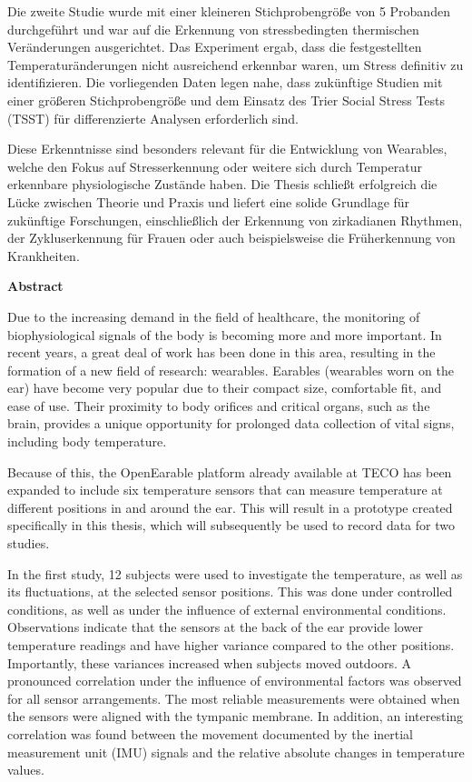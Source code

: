Die zweite Studie wurde mit einer kleineren Stichprobengröße von 5 Probanden durchgeführt und war auf die Erkennung von stressbedingten thermischen Veränderungen ausgerichtet. 
Das Experiment ergab, dass die festgestellten Temperaturänderungen nicht ausreichend erkennbar waren, um Stress definitiv zu identifizieren.
Die vorliegenden Daten legen nahe, dass zukünftige Studien mit einer größeren Stichprobengröße und dem Einsatz des Trier Social Stress Tests (TSST) für differenzierte Analysen erforderlich sind.

Diese Erkenntnisse sind besonders relevant für die Entwicklung von Wearables, welche den Fokus auf Stresserkennung oder weitere sich durch Temperatur erkennbare physiologische Zustände haben. 
Die Thesis schließt erfolgreich die Lücke zwischen Theorie und Praxis und liefert eine solide Grundlage für zukünftige Forschungen, einschließlich der Erkennung von zirkadianen Rhythmen, der Zykluserkennung für Frauen oder auch beispielsweise die Früherkennung von Krankheiten.

\cleardoublepage
\vspace*{1em}
\begin{center}
	\textbf{Abstract}
\end{center}
\par

Due to the increasing demand in the field of healthcare, the monitoring of biophysiological signals of the body is becoming more and more important.
In recent years, a great deal of work has been done in this area, resulting in the formation of a new field of research: wearables.
Earables (wearables worn on the ear) have become very popular due to their compact size, comfortable fit, and ease of use. 
Their proximity to body orifices and critical organs, such as the brain, provides a unique opportunity for prolonged data collection of vital signs, including body temperature.


Because of this, the OpenEarable platform already available at TECO has been expanded to include six temperature sensors that can measure temperature at different positions in and around the ear. 
This will result in a prototype created specifically in this thesis, which will subsequently be used to record data for two studies.

In the first study, 12 subjects were used to investigate the temperature, as well as its fluctuations, at the selected sensor positions. 
This was done under controlled conditions, as well as under the influence of external environmental conditions. 
Observations indicate that the sensors at the back of the ear provide lower temperature readings and have higher variance compared to the other positions. 
Importantly, these variances increased when subjects moved outdoors. 
A pronounced correlation under the influence of environmental factors was observed for all sensor arrangements. 
The most reliable measurements were obtained when the sensors were aligned with the tympanic membrane. 
In addition, an interesting correlation was found between the movement documented by the inertial measurement unit (IMU) signals and the relative absolute changes in temperature values.

